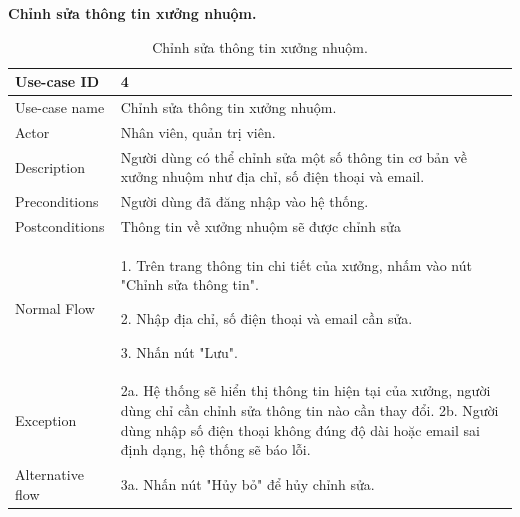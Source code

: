 \textbf{Chỉnh sửa thông tin xưởng nhuộm.}
\begin{table}[!htp]
    \centering
    \begin{tabular}{|m{3cm}|m{10cm}|}
    \hline 
        Use-case ID & 4\\ \hline
        Use-case name & Chỉnh sửa thông tin xưởng nhuộm.\\ \hline
        Actor & Nhân viên, quản trị viên.\\ \hline
        Description & Người dùng có thể chỉnh sửa một số thông tin cơ bản về xưởng nhuộm như địa chỉ, số điện thoại và email.\\ \hline
        Preconditions & Người dùng đã đăng nhập vào hệ thống.\\ \hline
        Postconditions & Thông tin về xưởng nhuộm sẽ được chỉnh sửa\\ \hline
        Normal Flow & 
        1. Trên trang thông tin chi tiết của xưởng, nhấm vào nút "Chỉnh sửa thông tin".\par
        2. Nhập địa chỉ, số điện thoại và email cần sửa.\par
        3. Nhấn nút "Lưu".
        \\ \hline
        Exception & 
        2a. Hệ thống sẽ hiển thị thông tin hiện tại của xưởng, người dùng chỉ cần chỉnh sửa thông tin nào cần thay đổi.
        2b. Người dùng nhập số điện thoại không đúng độ dài hoặc email sai định dạng, hệ thống sẽ báo lỗi.
        \\ \hline
        Alternative flow & 
        3a. Nhấn nút "Hủy bỏ" để hủy chỉnh sửa.
        \\ 
    \hline 
    \end{tabular}
    \caption{Chỉnh sửa thông tin xưởng nhuộm.}
    \label{bang4}
\end{table}

